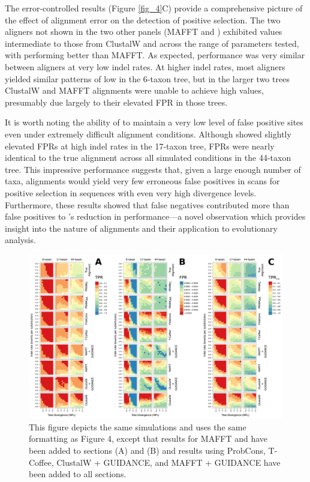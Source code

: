 The error-controlled \tpr results (Figure \ref{fig_4}C) provide a
comprehensive picture of the effect of alignment error on the detection of
\sw positive selection. The two aligners not shown in the two other
panels (MAFFT and \pranka) exhibited \tpr values intermediate to those
from ClustalW and \prankc across the range of parameters tested, with \pranka performing
better than MAFFT. As
expected, performance was very similar between aligners at very low
indel rates. At higher indel rates, most aligners yielded similar
patterns of low \tpr in the 6-taxon tree, but in the larger two trees
ClustalW and MAFFT alignments were unable to achieve high \tpr
values, presumably due largely to their elevated FPR in those trees.

It is worth noting the ability of \prankc to maintain a very low level
of false positive sites even under extremely difficult alignment
conditions. Although \prankc showed slightly elevated FPRs at high
indel rates in the 17-taxon tree, FPRs were nearly identical to the
true alignment across all simulated conditions in the 44-taxon
tree. This impressive performance suggests that, given a large enough
number of taxa, \prankc alignments would yield very few erroneous
false positives in scans for positive selection in sequences with even
very high divergence levels. Furthermore, these results showed that
false negatives contributed more than false positives to \prankc{}'s
reduction in \sw performance---a novel observation which provides
insight into the nature of \prankc alignments and their application to
\sw evolutionary analysis.

\begin{landscape}
\begin{figure}
\centering
\includegraphics[scale=0.65]{Figs/supp_fig1.pdf}
\caption{This figure depicts the same simulations and uses the same
  formatting as Figure 4, except that results for MAFFT and \pranka
  have been added to sections (A) and (B) and results using ProbCons,
  T-Coffee, ClustalW + GUIDANCE, and MAFFT + GUIDANCE have been added
  to all sections.}
\label{fig_s1}
\end{figure}
\end{landscape}


